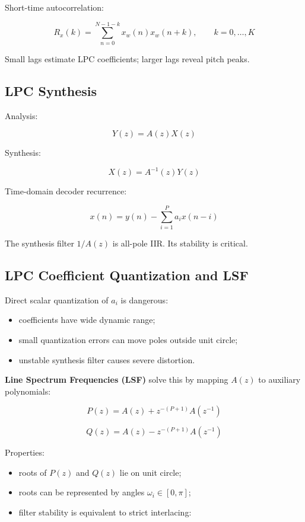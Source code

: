 Short-time autocorrelation:

\[
R_x(k)=\sum_{n=0}^{N-1-k}x_w(n)x_w(n+k),
\qquad k=0,\ldots,K
\]

Small lags estimate LPC coefficients; larger lags reveal pitch peaks.

\subsection{LPC Synthesis}

Analysis:

\[
Y(z)=A(z)X(z)
\]

Synthesis:

\[
X(z)=A^{-1}(z)Y(z)
\]

Time-domain decoder recurrence:

\[
x(n)=y(n)-\sum_{i=1}^{P}a_i x(n-i)
\]

The synthesis filter $1/A(z)$ is all-pole IIR. Its stability is critical.

\subsection{LPC Coefficient Quantization and LSF}

Direct scalar quantization of $a_i$ is dangerous:

\begin{itemize}
  \item coefficients have wide dynamic range;
  \item small quantization errors can move poles outside unit circle;
  \item unstable synthesis filter causes severe distortion.
\end{itemize}

\textbf{Line Spectrum Frequencies (LSF)} solve this by mapping $A(z)$ to auxiliary polynomials:

\[
P(z)=A(z)+z^{-(P+1)}A(z^{-1})
\]

\[
Q(z)=A(z)-z^{-(P+1)}A(z^{-1})
\]

Properties:

\begin{itemize}
  \item roots of $P(z)$ and $Q(z)$ lie on unit circle;
  \item roots can be represented by angles $\omega_i \in [0,\pi]$;
  \item filter stability is equivalent to strict interlacing:
\end{itemize}

